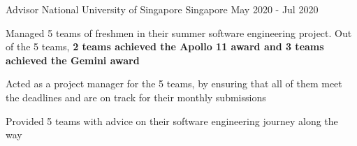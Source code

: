 \begin{cventries}
  \cventry
  {Advisor} %
  {National University of Singapore} %
  {Singapore} %
  {May 2020 - Jul 2020} %
  {
    \begin{cvitems}
      \item {Managed 5 teams of freshmen in their summer software engineering project. Out of the 5 teams, \textbf{2 teams achieved the Apollo 11 award and 3 teams achieved the Gemini award}}
      \item {Acted as a project manager for the 5 teams, by ensuring that all of them meet the deadlines and are on track for their monthly submissions}
      \item {Provided 5 teams with advice on their software engineering journey along the way}
    \end{cvitems}
  }


\end{cventries}
